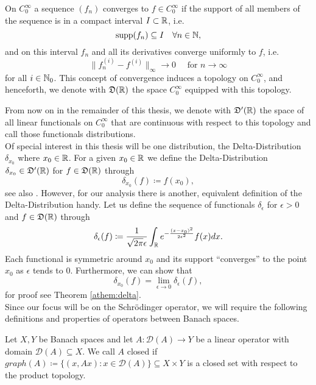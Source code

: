 \begin{definition}[Distributions]
	On $C_{0}^{\infty}$ a sequence $(f_{n})$ converges to $f \in C_{0}^{\infty}$ if the support of all members of the sequence is in a compact interval $I \subset \mathbb{R}$, i.e.
	$$ \operatorname{supp} (f_{n}) \subseteq I \quad \forall n \in \mathbb{N}, $$
	and on this interval $f_{n}$ and all its derivatives converge uniformly to $f$, i.e.
	\[ \| f_{n}^{(i)} - f^{(i)} \|_{\infty} \rightarrow 0 \quad \text{ for } n \rightarrow \infty \]
	for all $i \in \mathbb{N}_{0}$. This concept of convergence induces a topology on $C_{0}^{\infty}$, and henceforth, we denote with $\mathfrak{D}(\mathbb{R})$ the space $C_{0}^{\infty}$ equipped with this topology.
\end{definition}

From now on in the remainder of this thesis, we denote with $\mathfrak{D}'(\mathbb{R})$ the space of all linear functionals on $C_{0}^{\infty}$ that are continuous with respect to this topology and call those functionals distributions.  
~\\

Of special interest in this thesis will be one distribution, the Delta-Distribution $\delta_{x_{0}}$ where $x_{0} \in \mathbb{R}$. For a given $x_{0} \in \mathbb{R}$ we define the Delta-Distribution $\delta_{x_{0}} \in \mathfrak{D}'(\mathbb{R})$ for $f \in \mathfrak{D}(\mathbb{R})$ through
		\[  \delta_{x_{0}}(f) \coloneqq f(x_{0}), \]
	see also \cite[section 1.4]{weis2015spektheo}. However, for our analysis there is another, equivalent definition of the Delta-Distribution handy. Let us define the sequence of functionals $\delta_{\epsilon}$ for $\epsilon > 0$ and $f \in \mathfrak{D}(\mathbb{R})$ through
	\begin{equation}
		\delta_{\epsilon}(f) \coloneqq \frac{1}{\sqrt{2 \pi} \epsilon} \int_{\mathbb{R}} e^{-\frac{(x - x_{0})^{2}}{2 \epsilon^{2}}} f(x) dx. \label{eq:2.1-smooth_potential}
	\end{equation}
 	Each functional is symmetric around $x_{0}$ and its support \enquote{converges} to the point $x_{0}$ as $\epsilon$ tends to $0$. Furthermore, we can show that 
 	\[ \delta_{x_{0}}(f) = \lim_{\epsilon \rightarrow 0} \delta_{\epsilon}(f), \]
 	for proof see Theorem \ref{athem:delta}.
~\\

Since our focus will be on the Schrödinger operator, we will require the following definitions and properties of operators between Banach spaces.
\begin{definition} 
Let $X, Y$ be Banach spaces and let $A \colon \mathcal{D}(A) \rightarrow Y$ be a linear operator with domain $\mathcal{D}(A) \subseteq X$. We call $A$ closed if $graph(A) \coloneqq \{ (x, Ax) : x \in \mathcal{D}(A) \} \subseteq X \times Y$ is a closed set with respect to the product topology.
\end{definition}

